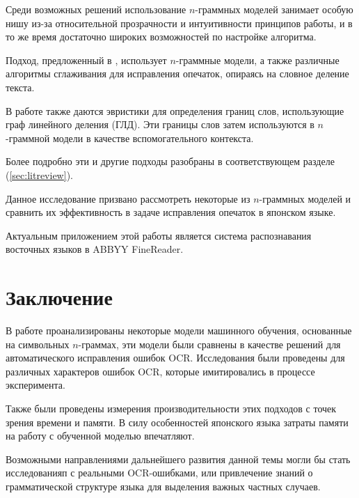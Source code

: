 \documentclass[14pt,russian]{extreport}
\theoremstyle{definition}
\begin{document}
Среди возможных решений использование $n$-граммных моделей занимает особую нишу из-за относительной прозрачности и интуитивности принципов работы, и в то же время достаточно широких возможностей по настройке алгоритма.

Подход, предложенный в \cite{nagata:shape}, использует $n$-граммные модели, а также различные алгоритмы сглаживания для исправления опечаток, опираясь на словное деление текста. 

В работе \cite{nagata:context} также даются эвристики для определения границ слов, использующие граф линейного деления (ГЛД). Эти границы слов затем используются в $n$-граммной модели в качестве вспомогательного контекста.

Более подробно эти и другие подходы разобраны в соответствующем разделе (\cref{sec:litreview}).

Данное исследование призвано рассмотреть некоторые из $n$-граммных моделей и сравнить их эффективность в задаче исправления опечаток в японском языке.

Актуальным приложением этой работы является система распознавания восточных языков в ABBYY FineReader.

\newpage


\newpage


\newpage


\newpage


\newpage


\newpage


\newpage


\newpage
\section{ Заключение }\label{sec:epilogue}

В работе проанализированы некоторые модели машинного обучения, основанные на символьных $n$-граммах, эти модели были сравнены в качестве решений для автоматического исправления ошибок OCR. Исследования были проведены для различных характеров ошибок OCR, которые имитировались в процессе эксперимента.

Также были проведены измерения производительности этих подходов с точек зрения времени и памяти. В силу особенностей японского языка затраты памяти на работу с обученной моделью впечатляют.

Возможными направлениями дальнейшего развития данной темы могли бы стать исследованияп с реальными OCR-ошибками, или привлечение знаний о грамматической структуре языка для выделения важных частных случаев.

\newpage


\newpage

\end{document}
